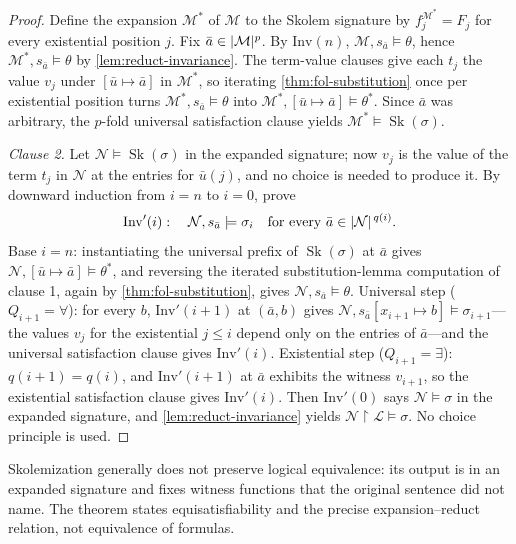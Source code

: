 \documentclass[11pt,oneside,openany]{book}
\theoremstyle{definition}
\theoremstyle{plain}
\theoremstyle{remark}
\DeclarePairedDelimiter{\abs}{\lvert}{\rvert}
\newcommand{\Lang}{\mathcal{L}}
\newcommand{\Meta}{\mathcal{M}}
\newcommand{\restr}{\mathbin{\upharpoonright}}
\newcommand{\entails}{\models}
\begin{document}
\begin{proof}
Define the expansion \(\Meta^{*}\) of \(\Meta\) to the Skolem signature
by \(f_j^{\Meta^{*}}=F_j\) for every existential position \(j\).  Fix
\(\bar a\in\abs{\Meta}^{p}\).  By \(\mathrm{Inv}(n)\),
\(\Meta,s_{\bar a}\entails\theta\), hence
\(\Meta^{*},s_{\bar a}\entails\theta\) by \cref{lem:reduct-invariance}.
The term-value clauses give each \(t_j\) the value \(v_j\) under
\([\bar u\mapsto\bar a]\) in \(\Meta^{*}\), so iterating
\cref{thm:fol-substitution} once per existential position turns
\(\Meta^{*},s_{\bar a}\entails\theta\) into
\(\Meta^{*},[\bar u\mapsto\bar a]\entails\theta^{*}\).  Since \(\bar a\)
was arbitrary, the \(p\)-fold universal satisfaction clause yields
\(\Meta^{*}\entails\operatorname{Sk}(\sigma)\).

\emph{Clause 2.}  Let \(\mathcal N\entails\operatorname{Sk}(\sigma)\) in
the expanded signature; now \(v_j\) is the value of the term \(t_j\) in
\(\mathcal N\) at the entries for \(\bar u(j)\), and no choice is needed
to produce it.  By downward induction from \(i=n\) to \(i=0\), prove
\[
 \mathrm{Inv}'(i):\quad
 \mathcal N,s_{\bar a}\entails\sigma_i
 \quad\text{for every }\bar a\in\abs{\mathcal N}^{\,q(i)}.
\]
Base \(i=n\): instantiating the universal prefix of
\(\operatorname{Sk}(\sigma)\) at \(\bar a\) gives
\(\mathcal N,[\bar u\mapsto\bar a]\entails\theta^{*}\), and reversing the
iterated substitution-lemma computation of clause 1, again by
\cref{thm:fol-substitution}, gives
\(\mathcal N,s_{\bar a}\entails\theta\).  Universal step
(\(Q_{i+1}=\forall\)): for every \(b\), \(\mathrm{Inv}'(i+1)\) at
\((\bar a,b)\) gives
\(\mathcal N,s_{\bar a}[x_{i+1}\mapsto b]\entails\sigma_{i+1}\)---the
values \(v_j\) for the existential \(j\le i\) depend only on the entries
of \(\bar a\)---and the universal satisfaction clause gives
\(\mathrm{Inv}'(i)\).  Existential step (\(Q_{i+1}=\exists\)):
\(q(i+1)=q(i)\), and \(\mathrm{Inv}'(i+1)\) at \(\bar a\) exhibits the
witness \(v_{i+1}\), so the existential satisfaction clause gives
\(\mathrm{Inv}'(i)\).  Then \(\mathrm{Inv}'(0)\) says
\(\mathcal N\entails\sigma\) in the expanded signature, and
\cref{lem:reduct-invariance} yields
\(\mathcal N\restr\Lang\entails\sigma\).  No choice principle is used.
\end{proof}

Skolemization generally does not preserve logical equivalence: its output is
in an expanded signature and fixes witness functions that the original
sentence did not name.  The theorem states equisatisfiability and the precise
expansion--reduct relation, not equivalence of formulas.
\end{document}
